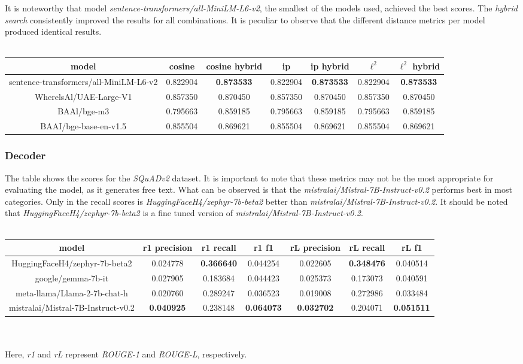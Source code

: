 \documentclass{article}
\begin{document}
It is noteworthy that model \textit{sentence-transformers/all-MiniLM-L6-v2}, the smallest of the models used, achieved the best scores. The \textit{hybrid search} consistently improved the results for all combinations. It is peculiar to observe that the different distance metrics per model produced identical results.\\
\\
\begin{tabular}{ |c|c|c|c|c|c|c|  }
 \hline

 model& cosine &cosine hybrid&ip&ip hybrid& $\ell^{2}$&$\ell^{2}$ hybrid\\
 \hline
 \hline
 sentence-transformers/all-MiniLM-L6-v2& 0.822904&\textbf{0.873533}&0.822904&\textbf{0.873533}&0.822904&\textbf{0.873533}\\
 \hline
 WherelsAl/UAE-Large-V1& 0.857350&0.870450&0.857350&0.870450&0.857350&0.870450\\
 \hline
 BAAl/bge-m3& 0.795663&0.859185&0.795663&0.859185&0.795663&0.859185\\
 \hline
 BAAI/bge-base-en-v1.5& 0.855504&0.869621&0.855504&0.869621&0.855504&0.869621\\
 \hline
\end{tabular}

\subsubsection*{Decoder}\label{mlresult}
The table shows the scores for the \textit{SQuADv2} dataset. It is important to note that these metrics may not be the most appropriate for evaluating the model, as it generates free text.
What can be observed is that the \textit{mistralai/Mistral-7B-Instruct-v0.2} performs best in most categories. Only in the recall scores is \textit{HuggingFaceH4/zephyr-7b-beta2} better than \textit{mistralai/Mistral-7B-Instruct-v0.2}. It should be noted that \textit{HuggingFaceH4/zephyr-7b-beta2} is a fine tuned version of \textit{mistralai/Mistral-7B-Instruct-v0.2}.\\
\\
\begin{tabular}{ |c|c|c|c|c|c|c|  }
 \hline

 model& r1 precision &r1 recall&r1 f1&rL precision&rL recall&rL f1\\
 \hline
 \hline
 HuggingFaceH4/zephyr-7b-beta2& 0.024778&\textbf{0.366640}&0.044254&0.022605&\textbf{0.348476}&0.040514\\
 \hline
 google/gemma-7b-it& 0.027905&0.183684&0.044423&0.025373&0.173073&0.040591\\
 \hline
 meta-llama/Llama-2-7b-chat-h&0.020760&0.289247&0.036523&0.019008&0.272986&0.033484\\
 \hline
 mistralai/Mistral-7B-Instruct-v0.2& \textbf{0.040925}&0.238148&\textbf{0.064073}&\textbf{0.032702}&0.204071&\textbf{0.051511}\\
 \hline
\end{tabular}
\\
\\
Here, \textit{r1} and \textit{rL} represent \textit{ROUGE-1} and \textit{ROUGE-L}, respectively.
\end{document}
